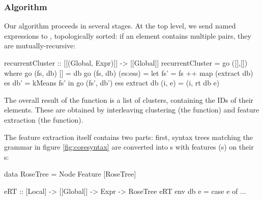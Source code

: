 \subsubsection{Algorithm}
\label{sec:algorithm}
\iffalse TODO: the code should go in the implementation section rather than here \fi
\iffalse TODO: give a more abstract presentation, using mathematical notation \fi
\iffalse TODO: maybe focus on the ``interesting cases'', and defer the nitty-gritty of extending the environment, etc. to the implementation section? \fi
\iffalse TODO: Define rose trees \fi
\iffalse TODO: Show an example from earlier, e.g. factorial \fi
\iffalse TODO: Split into three parts: expressions to rose trees of features; rose trees to matrices to vectors; k-means clustering \fi
\iffalse TODO: highlight the recurrent nature of the algorithm \fi
\iffalse TODO: I would probably just restructure:
 - start with the syntax, get to show how, for every line of figure 1, extraction works
 - then transformation to feature vectors
 - then k-means
obviously, they are mutually recursive...
\fi

Our algorithm proceeds in several stages. At the top level, we send named expressions to , topologically sorted: if an element contains multiple  pairs, they are mutually-recursive:

\begin{haskell}
recurrentCluster :: [[(Global, Expr)]] -> [[Global]]
recurrentCluster = go ([],[])
  where go (fs, db) []       = db
        go (fs, db) (es:ess) = let fs' = fs ++ map (extract db) es
                                   db' = kMeans fs'
                                in go (fs', db') ess
        extract db (i, e) = (i, rt db e)
\end{haskell}

The overall result of the  function is a list of clusters, containing the IDs of their elements. These are obtained by interleaving clustering (the  function) and feature extraction (the  function).

The feature extraction itself contains two parts: first, syntax trees matching the grammar in figure \ref{fig:coresyntax} are converted into s with features (s) on their s:

\begin{haskell}
data RoseTree = Node Feature [RoseTree]

eRT :: [Local] -> [[Global]] -> Expr -> RoseTree
eRT env db e = case e of
  ...
\end{haskell}

